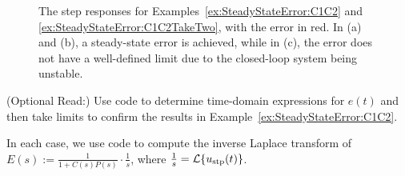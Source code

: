 \begin{figure}[htb]%
\centering
\hfill{}%
\hfill
\hfill{}%
\newline
\centering
{}%
\hfill
    \caption[]{The step responses for Examples~\ref{ex:SteadyStateError:C1C2} and \ref{ex:SteadyStateError:C1C2TakeTwo}, with the error in red. In (a) and (b), a steady-state error is achieved, while in (c), the error does not have a well-defined limit due to the closed-loop system being unstable.}
    \label{fig:SteadyStateError:C1C2}
\end{figure}

\bigskip

\begin{example}
\label{ex:SteadyStateError:C1C2TakeTwo}
(Optional Read:) Use code to determine time-domain expressions for $e(t)$ and then take limits to confirm the results in Example~\ref{ex:SteadyStateError:C1C2}.  
\end{example}
\solutions 

In each case, we use code to compute the inverse Laplace transform of $E(s):= \frac{1}{1 + C(s)P(s)}\cdot \frac{1}{s}$, where $\frac{1}{s}={\cal L}\{ u_{\rm stp}(t) \}$.\\


